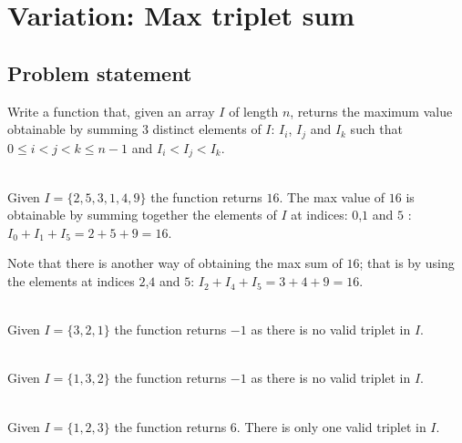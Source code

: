 %



\section*{Variation: Max triplet sum}
\label{ch:max_triplet}

\subsection{Problem statement}
\begin{exercise}
\label{example:max_triplet:exercice1}
Write a function that, given an array $I$ of length $n$, returns the maximum value obtainable by
summing $3$ distinct elements of $I$: $I_i$, $I_j$ and $I_k$ such that $ 0 \leq i < j < k \leq n-1$
and $ I_i < I_j < I_k $.


	\begin{example}
		\label{example:max_triplet:example1}
		\hfill \\
		Given $I = \{2, 5, 3, 1, 4, 9\}$ the function returns $16$. The max value of $16$ is
		obtainable by summing together the elements of $I$ at indices: $0$,$1$ and $5$ : $I_0 +
		I_1+I_5=2+5+9= 16$.
		
		Note that there is another way of obtaining the max sum of $16$; that is by using the
		elements at indices $2$,$4$ and $5$: $I_2 + I_4+I_5=3+4+9= 16$.
	\end{example}

	\begin{example}
		\label{example:max_triplet:example2}
		\hfill \\
		Given $I = \{3,2,1\}$ the function returns $-1$ as there is no valid triplet in $I$.		
	\end{example}
	
		\begin{example}
			\hfill \\
			Given $I = \{1,3,2\}$ the function returns $-1$ as there is no valid triplet in $I$.
			\label{ex:max_triplet:example2}	
		\end{example}

	\begin{example}
		\hfill \\
		Given $I = \{1,2,3\}$ the function returns $6$. There is only one valid triplet in $I$.
	\label{ex:max_triplet:example3}
	\end{example}
\end{exercise}

